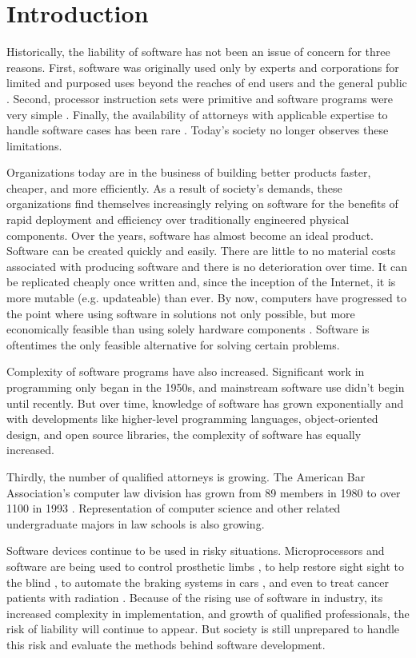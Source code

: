 \chapter{Introduction}

Historically, the liability of software has not been an issue of
concern for three reasons. First, software was originally used only by experts
and corporations for limited and purposed uses beyond the reaches of end
users and the general public \cite{Leveson95}. Second, processor instruction 
sets were primitive and software programs were very simple \cite{Storey95}. 
Finally, the availability of attorneys with applicable expertise to handle 
software cases has been rare \cite{Armour93}. Today's society no longer observes
these limitations.

Organizations today are in the business of building better products faster,
cheaper, and more efficiently. As a result of society's demands, these
organizations find themselves increasingly relying on software for the benefits
of rapid deployment and efficiency over traditionally engineered physical
components. Over the years, software has almost become an ideal product.
Software can be created quickly and easily. There are little to no material
costs associated with producing software and there is no deterioration over
time. It can be replicated cheaply once written and, since the inception of the
Internet, it is more mutable (e.g. updateable) than ever. By now, computers
have progressed to the point where using software in solutions not only
possible, but more economically feasible than using solely hardware components 
\cite{Baase97}. Software is oftentimes the only feasible alternative for solving
certain problems.

Complexity of software programs have also increased. Significant work in
programming only began in the 1950s, and mainstream software use didn't begin
until recently. But over time, knowledge of software has grown exponentially
and with developments like higher-level programming languages, object-oriented
design, and open source libraries, the complexity of software has equally
increased.

Thirdly, the number of qualified attorneys is growing. The American Bar 
Association's computer law division has grown from 89 members in 1980 to over 
1100 in 1993 \cite{Armour93}. Representation of computer science and other
related undergraduate majors in law schools is also growing.

Software devices continue to be used in risky situations. Microprocessors and
software are being used to control prosthetic limbs \cite{Graupe78}, to help
restore sight sight to the blind \cite{Fox95}, to automate the braking systems
in cars \cite{Hurtig94}, and even to treat cancer patients with radiation
\cite{Leveson93}. Because of the rising use of software in industry, its
increased complexity in implementation, and growth of qualified professionals,
the risk of liability will continue to appear. But society is still unprepared
to handle this risk and evaluate the methods behind software development.


